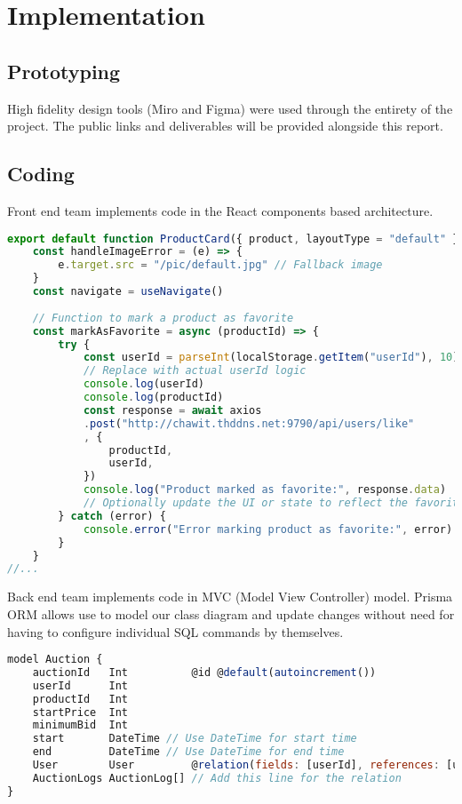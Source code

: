 %
%
\chapter{Implementation}

\section{Prototyping}

High fidelity design tools (Miro and Figma) were used through the entirety of the project. The public links and deliverables will be provided alongside this report.

\section{Coding}

Front end team implements code in the React components based architecture.

\begin{lstlisting}[language=JavaScript, caption={React Based Components example (View for MVC architecture)}]
export default function ProductCard({ product, layoutType = "default" }) {
	const handleImageError = (e) => {
		e.target.src = "/pic/default.jpg" // Fallback image
	}
	const navigate = useNavigate()
	
	// Function to mark a product as favorite
	const markAsFavorite = async (productId) => {
		try {
			const userId = parseInt(localStorage.getItem("userId"), 10) 
			// Replace with actual userId logic
			console.log(userId)
			console.log(productId)
			const response = await axios
			.post("http://chawit.thddns.net:9790/api/users/like"
			, {
				productId,
				userId,
			})
			console.log("Product marked as favorite:", response.data)
			// Optionally update the UI or state to reflect the favorite status
		} catch (error) {
			console.error("Error marking product as favorite:", error)
		}
	}
//...
\end{lstlisting}


Back end team implements code in MVC (Model View Controller) model. Prisma ORM allows use to model our class diagram and update changes without need for having to configure individual SQL commands by themselves.

\begin{lstlisting}[language=JavaScript, caption={Model for MVC architecture}]
model Auction {
	auctionId   Int          @id @default(autoincrement())
	userId      Int
	productId   Int
	startPrice  Int
	minimumBid  Int
	start       DateTime // Use DateTime for start time
	end         DateTime // Use DateTime for end time
	User        User         @relation(fields: [userId], references: [userId])
	AuctionLogs AuctionLog[] // Add this line for the relation
}
\end{lstlisting}


